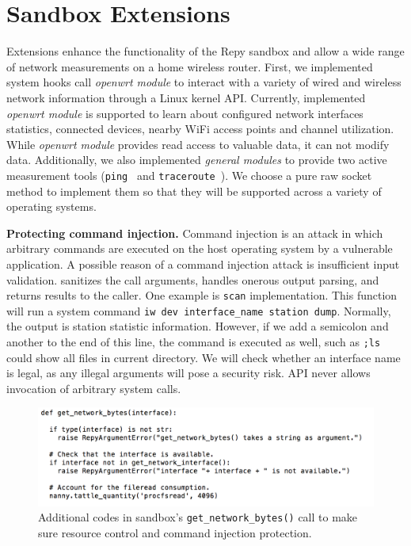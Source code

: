 \section{Sandbox Extensions}
\label{sec.extensions}
Extensions enhance the functionality of the Repy sandbox and allow a wide range of network measurements on a home wireless router. First, we implemented system hooks call \textit{openwrt module} to interact with a variety of wired and wireless network information through a Linux kernel API. Currently, implemented \textit{openwrt module} is supported to learn about configured network interfaces statistics, connected devices, nearby WiFi access points and channel utilization. While \textit{openwrt module} provides read access to valuable data, it can not modify data. Additionally, we also implemented \textit{general modules} to provide two active measurement tools (\texttt{ping}~\cite{pingcode} and \texttt{traceroute}~\cite{traceroutecode}). We choose a pure raw socket method to implement them so that they will be supported across a variety of operating systems. 

\textbf{Protecting command injection.} Command injection is an attack in which arbitrary commands are executed on the host operating system by a vulnerable application. A possible reason of a command injection attack is insufficient input validation. \sysname sanitizes the call arguments, handles onerous output parsing, and returns results to the caller. One example is \texttt{scan} implementation. This function will run a system command \texttt{iw dev interface\_name station dump}. Normally, the output is station statistic information. However, if we add a semicolon and another to the end of this line, the command is executed as well, such as \texttt{;ls} could show all files in current directory. We will check whether an interface name is legal, as any illegal arguments will pose a security risk. \sysname API never allows invocation of arbitrary system calls.

\begin{figure}%
\centering
\includegraphics[width=0.8\columnwidth]{figure/nanny.png}
\caption{Additional codes in \sysname sandbox's \texttt{get\_network\_bytes()} call to make sure resource control and command injection protection.}
\label{fig-nanny}
\end{figure}

